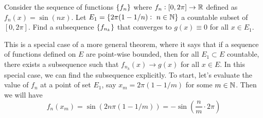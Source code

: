 \begin{example}
	Consider the sequence of functions $ \{f_n\} $ where $ f_n: [0,2\pi]\to \mathbb{R} $ defined as $ f_n(x) = \sin(n x) $. Let $ E_1 = \{2\pi(1-1/n):\ n\in\mathbb{N}\} $ a countable subset of $ [0,2\pi] $. Find a subsequence $ \{f_{n_k}\} $ that converges to $ g(x) \equiv 0 $ for all $ x \in E_1 $.
	
	\begin{solution}
		This is a special case of a more general theorem, where it says that if a sequence of functions defined on $ E $ are point-wise bounded, then for all $ E_1
		\subset E $ countable, there exists a subsequence such that $ f_{n_k}(x)\to g(x)  $ for all $ x \in E $. In this special case, we can find the subsequence explicitly. To start, let's evaluate the value of $ f_n $ at a point of set $ E_1 $, say $ x_m = 2\pi(1-1/m) $ for some $ m \in \mathbb{N} $. Then we will have
		\[ f_n(x_m) = \sin(2n\pi(1-1/m)) = -\sin(\frac{n}{m}\cdot 2\pi) \]
	\end{solution}
\end{example}

%


\newpage
